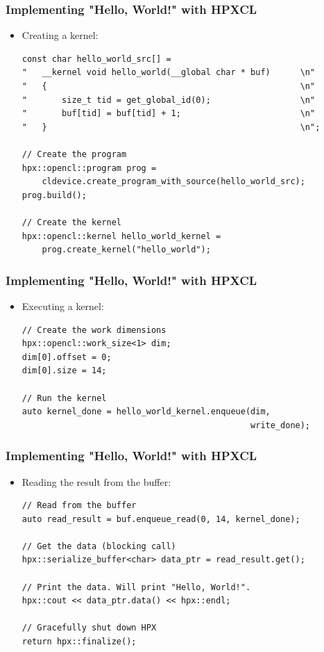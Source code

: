 \documentclass{beamer}
\begin{document}
\begin{frame}[fragile]
    \frametitle{Implementing "Hello, World!" with HPXCL}
    \begin{itemize}
        \item Creating a kernel:
        \begin{lstlisting}[firstnumber=53]
const char hello_world_src[] =                                            
"   __kernel void hello_world(__global char * buf)      \n"
"   {                                                   \n"
"       size_t tid = get_global_id(0);                  \n"
"       buf[tid] = buf[tid] + 1;                        \n"
"   }                                                   \n";

// Create the program
hpx::opencl::program prog =
    cldevice.create_program_with_source(hello_world_src);     
prog.build();                                                            
                                                                         
// Create the kernel                                             
hpx::opencl::kernel hello_world_kernel =
    prog.create_kernel("hello_world");           
        \end{lstlisting}
    \end{itemize}
\end{frame}

\begin{frame}[fragile]
    \frametitle{Implementing "Hello, World!" with HPXCL}
    \begin{itemize}
        \item Executing a kernel:
        \begin{lstlisting}[firstnumber=69]
// Create the work dimensions
hpx::opencl::work_size<1> dim;
dim[0].offset = 0;
dim[0].size = 14;

// Run the kernel
auto kernel_done = hello_world_kernel.enqueue(dim,
                                              write_done);
        \end{lstlisting}
    \end{itemize}
\end{frame}

\begin{frame}[fragile]
    \frametitle{Implementing "Hello, World!" with HPXCL}
    \begin{itemize}
        \item Reading the result from the buffer:
        \begin{lstlisting}[firstnumber=78]
// Read from the buffer
auto read_result = buf.enqueue_read(0, 14, kernel_done);

// Get the data (blocking call)
hpx::serialize_buffer<char> data_ptr = read_result.get();

// Print the data. Will print "Hello, World!".
hpx::cout << data_ptr.data() << hpx::endl;

// Gracefully shut down HPX
return hpx::finalize();
        \end{lstlisting}
    \end{itemize}
\end{frame}
\end{document}
